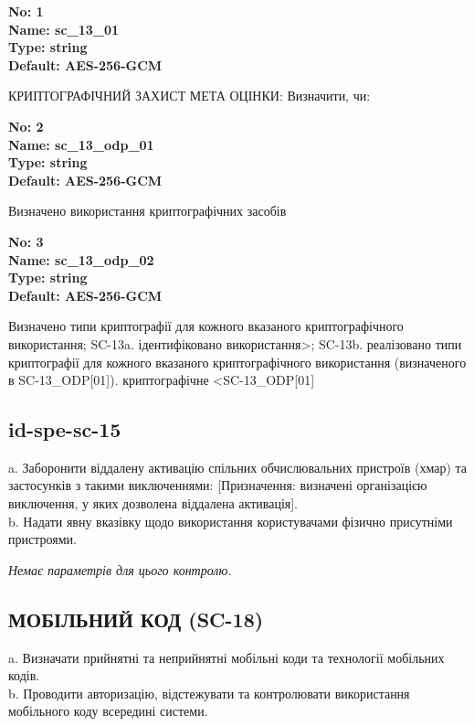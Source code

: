 \documentclass{article}
\begin{document}
\vspace{10pt}
{\footnotesize\bfseries
No: 1\\
Name: sc\_\allowbreak{}13\_\allowbreak{}01\\
Type: string\\
Default: \textquotedbl{}AES-256-GCM\textquotedbl{}
}

{\footnotesize КРИПТОГРАФІЧНИЙ ЗАХИСТ МЕТА ОЦІНКИ: Визначити, чи:}


{\footnotesize\bfseries
No: 2\\
Name: sc\_\allowbreak{}13\_\allowbreak{}odp\_\allowbreak{}01\\
Type: string\\
Default: \textquotedbl{}AES-256-GCM\textquotedbl{}
}

{\footnotesize Визначено використання криптографічних засобів}


{\footnotesize\bfseries
No: 3\\
Name: sc\_\allowbreak{}13\_\allowbreak{}odp\_\allowbreak{}02\\
Type: string\\
Default: \textquotedbl{}AES-256-GCM\textquotedbl{}
}

{\footnotesize Визначено типи криптографії для кожного вказаного криптографічного використання; SC-13a. ідентифіковано використання>; SC-13b. реалізовано типи криптографії для кожного вказаного криптографічного використання (визначеного в SC-13\_\allowbreak{}ODP[01]). криптографічне <SC-13\_\allowbreak{}ODP[01]}




\subsection{id-spe-sc-15}
a. Заборонити віддалену активацію спільних обчислювальних пристроїв (хмар) та застосунків з такими виключеннями: [Призначення: визначені організацією виключення, у яких дозволена віддалена активація].\\ 
b. Надати явну вказівку щодо використання користувачами фізично присутніми пристроями.

\vspace{10pt}
\textit{Немає параметрів для цього контролю.}
\vspace{10pt}


\subsection{МОБІЛЬНИЙ КОД (SC-18)}
a. Визначати прийнятні та неприйнятні мобільні коди та технології мобільних кодів.\\ 
b. Проводити авторизацію, відстежувати та контролювати використання мобільного коду всередині системи.
\end{document}
